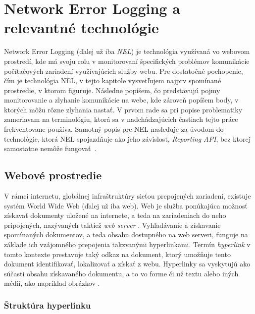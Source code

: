\chapter{Network Error Logging a relevantné technológie}
\label{nel-and-related-technologies}

Network Error Logging (ďalej už iba \emph{NEL}) je technológia využívaná vo webovom prostredí, 
kde má svoju rolu v monitorovaní špecifických problémov komunikácie počítačových zariadení využívajúcich služby webu.
Pre dostatočné pochopenie, čím je technológia NEL, v tejto kapitole vysvetľujem najprv 
spomínané prostredie, v ktorom figuruje. 
Následne popíšem, čo predstavujú pojmy monitorovanie a zlyhanie komunikácie na webe, kde zároveň popíšem body, v ktorých môžu rôzne zlyhania nastať. 
V prvom rade sa pri popise problematiky zameriavam na terminológiu, ktorá sa v nadchádzajúcich častiach tejto práce frekventovane používa. 
Samotný popis pre NEL nasleduje za úvodom do technológie, ktorá NEL spojazdňuje ako jeho závislosť, \emph{Reporting API}, bez ktorej samostatne nemôže \mbox{fungovať \cite{W3C-NEL}}.


\section{Webové prostredie}
\label{webove-prostredie}

V rámci internetu, globálnej infraštruktúry sieťou prepojených zariadení, existuje systém World Wide Web (ďalej už iba web).
Web je služba ponúkajúca možnosť získavať dokumenty uložené na internete, a teda na zariadeniach do neho pripojených, nazývaných taktiež \emph{web server} \cite{wiki-web}. 
Vyhľadávanie a získavanie spomínaných dokumentov, a teda obsahu dostupného na web serveri, funguje na základe ich vzájomného prepojenia takzvanými hyperlinkami.
Termín \emph{hyperlink} v tomto kontexte prestavuje taký odkaz na dokument, ktorý umožňuje tento dokument identifikovať, lokalizovať a získať z webu. 
Hyperlinky sa vyskytujú ako súčasti obsahu získavaného dokumentu, a to vo forme či už textu alebo iných médií, ako napríklad obrázkov \cite{wiki-hyperlink}. 

\subsection{Štruktúra hyperlinku}
\label{navigacia-na-webe}

